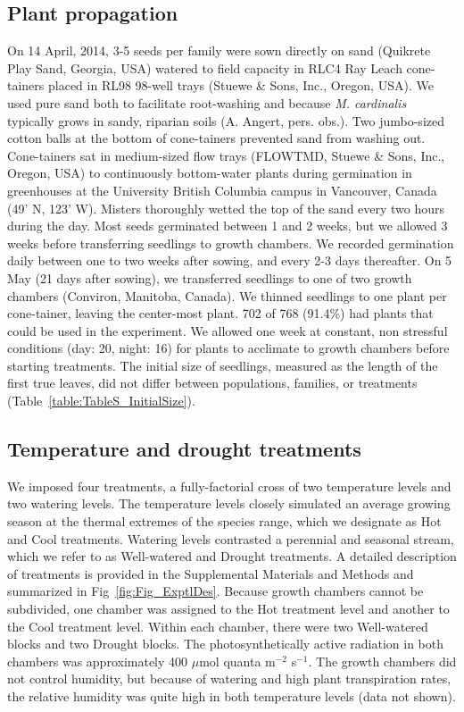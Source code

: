 \documentclass[11pt, oneside]{article}
\begin{document}
\subsection*{Plant propagation}

On 14 April, 2014, 3-5 seeds per family were sown directly on sand (Quikrete Play Sand, Georgia, USA) watered to field capacity in RLC4 Ray Leach cone-tainers placed in RL98 98-well trays (Stuewe \& Sons, Inc., Oregon, USA). We used pure sand both to facilitate root-washing and because \textit{M. cardinalis} typically grows in sandy, riparian soils (A. Angert, pers. obs.). Two jumbo-sized cotton balls at the bottom of cone-tainers prevented sand from washing out. Cone-tainers sat in medium-sized flow trays (FLOWTMD, Stuewe \& Sons, Inc., Oregon, USA) to continuously bottom-water plants during germination in greenhouses at the University British Columbia campus in Vancouver, Canada (49' N, 123' W). Misters thoroughly wetted the top of the sand every two hours during the day. Most seeds germinated between 1 and 2 weeks, but we allowed 3 weeks before transferring seedlings to growth chambers. We recorded germination daily between one to two weeks after sowing, and every 2-3 days thereafter. On 5 May (21 days after sowing), we transferred seedlings to one of two growth chambers (Conviron, Manitoba, Canada). We thinned seedlings to one plant per cone-tainer, leaving the center-most plant. 702 of 768 (91.4\%) had plants that could be used in the experiment. We allowed one week at constant, non stressful conditions (day: 20\celsius, night: 16\celsius) for plants to acclimate to growth chambers before starting treatments. The initial size of seedlings, measured as the length of the first true leaves, did not differ between populations, families, or treatments (Table~\ref{table:TableS_InitialSize}).
    
\subsection*{Temperature and drought treatments}

We imposed four treatments, a fully-factorial cross of two temperature levels and two watering levels. The temperature levels closely simulated an average growing season at the thermal extremes of the species range, which we designate as Hot and Cool treatments. Watering levels contrasted a perennial and seasonal stream, which we refer to as Well-watered and Drought treatments. A detailed description of treatments is provided in the Supplemental Materials and Methods and summarized in Fig~\ref{fig:Fig_ExptlDes}. Because growth chambers cannot be subdivided, one chamber was assigned to the Hot treatment level and another to the Cool treatment level. Within each chamber, there were two Well-watered blocks and two Drought blocks. The photosynthetically active radiation in both chambers was approximately 400 $\mu$mol quanta m$^{-2}$ s$^{-1}$. The growth chambers did not control humidity, but because of watering and high plant transpiration rates, the relative humidity was quite high in both temperature levels (data not shown). 
\end{document}
